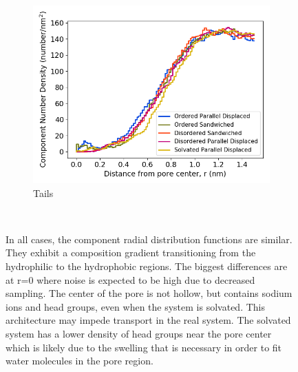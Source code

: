 \documentclass[journal=jpcbfk,manusciprt=article]{achemso}
\begin{document}
\begin{figure}[!htb]
\begin{subfigure}{0.32\textwidth}
        \includegraphics[width=1\linewidth]{tails_density.png}
        \caption{Tails}
        \label{fig:tails_regional_density}
  \end{subfigure}
  \caption{In all cases, the component radial distribution functions are similar. 
      They exhibit a composition gradient transitioning from the hydrophilic to the hydrophobic
	  regions. The biggest differences are at r=0 where noise is expected to be high due to 
	  decreased sampling. The center of the pore is not hollow, but contains sodium ions and 
	  head groups, even when the system is solvated. This architecture may impede transport in 
	  the real system. The solvated system has a lower density of head groups near the 
	  pore center which is likely due to the swelling that is necessary in order to fit water
	  molecules in the pore region.}~\label{fig:overlaid_densities}
  \end{figure}
\end{document}
